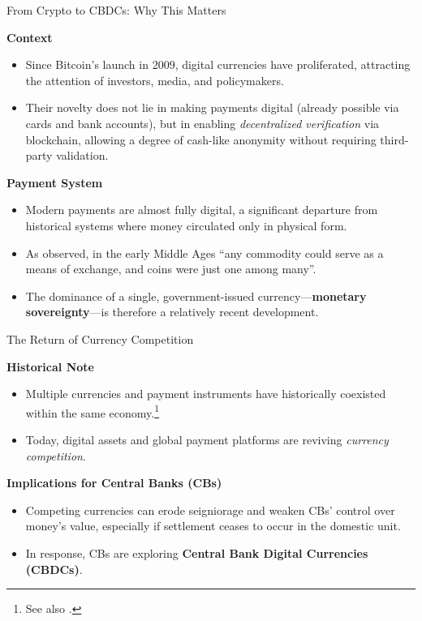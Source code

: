 \documentclass[11pt,aspectratio=169]{beamer}
\begin{document}
\begin{frame}{From Crypto to CBDCs: Why This Matters}
\small

\textbf{Context}
\begin{itemize}
  \item Since Bitcoin’s launch in 2009, digital currencies have proliferated, attracting the attention of investors, media, and policymakers.
  \item Their novelty does not lie in making payments digital (already possible via cards and bank accounts), but in enabling \emph{decentralized verification} via blockchain, allowing a degree of cash-like anonymity without requiring third-party validation.
\end{itemize}

\vspace{0.8em}

\textbf{Payment System}
\begin{itemize}
  \item Modern payments are almost fully digital, a significant departure from historical systems where money circulated only in physical form.
  \item As \textcite{cipolla1956} observed, in the early Middle Ages “any commodity could serve as a means of exchange, and coins were just one among many”.
  \item The dominance of a single, government-issued currency—\textbf{monetary sovereignty}—is therefore a relatively recent development.
\end{itemize}

\end{frame}


\begin{frame}{The Return of Currency Competition}
\small

\textbf{Historical Note}
\begin{itemize}
  \item Multiple currencies and payment instruments have historically coexisted within the same economy.\footnote{\tiny See also \textcite{cipolla1956, cipolla1982, cipolla1990}.}
  \item Today, digital assets and global payment platforms are reviving \emph{currency competition}.
\end{itemize}

\vspace{0.8em}
\textbf{Implications for Central Banks (CBs)}
\begin{itemize}
  \item Competing currencies can erode seigniorage and weaken CBs' control over money’s value, especially if settlement ceases to occur in the domestic unit.  
  \item In response, CBs are exploring \textbf{Central Bank Digital Currencies (CBDCs)}.
\end{itemize}
\end{frame}
\end{document}
